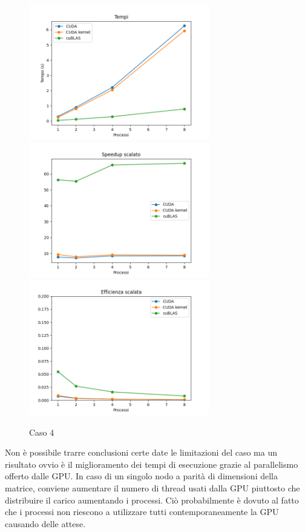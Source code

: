 \begin{figure}[h]
    \centering
    \includegraphics[width=0.7\textwidth]{./imgs/graphs/caso_d.png}
    \includegraphics[width=0.7\textwidth]{./imgs/graphs/caso_d_scaled_speedup.png}
    \includegraphics[width=0.7\textwidth]{./imgs/graphs/caso_d_scaled_efficiency.png}
    \caption{Caso 4}
\end{figure}

Non è possibile trarre conclusioni certe date le limitazioni del caso ma un risultato ovvio è il miglioramento dei tempi di esecuzione grazie al parallelismo offerto dalle GPU.
In caso di un singolo nodo a parità di dimensioni della matrice, conviene aumentare il numero di thread usati dalla GPU piuttosto che distribuire il carico aumentando i processi. Ciò probabilmente è dovuto al fatto che i processi non riescono a utilizzare tutti contemporaneamente la GPU causando delle attese.

